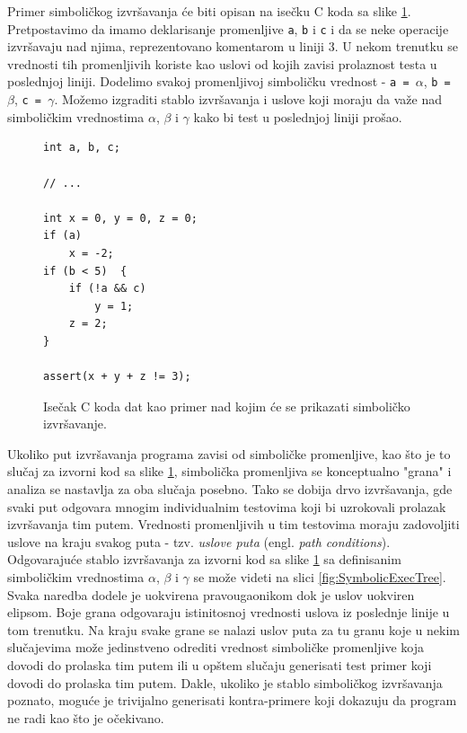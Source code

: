 Primer simboličkog izvršavanja će biti opisan na isečku C koda sa slike \ref{fig:SymbolicExecCode}. Pretpostavimo da imamo deklarisanje promenljive \texttt{a}, \texttt{b} i \texttt{c} i da se neke operacije izvršavaju nad njima, reprezentovano komentarom u liniji $3$. U nekom trenutku se vrednosti tih promenljivih koriste kao uslovi od kojih zavisi prolaznost testa u poslednjoj liniji. Dodelimo svakoj promenljivoj simboličku vrednost - \texttt{a = }$\alpha$, \texttt{b = }$\beta$, \texttt{c = }$\gamma$. Možemo izgraditi stablo izvršavanja i uslove koji moraju da važe nad simboličkim vrednostima $\alpha$, $\beta$ i $\gamma$ kako bi test u poslednjoj liniji prošao.

\begin{figure}[h!]
\begin{lstlisting}[language={}]
int a, b, c;

// ...

int x = 0, y = 0, z = 0;
if (a)      
    x = -2;
if (b < 5)  {
    if (!a && c)    
        y = 1;
    z = 2;
}

assert(x + y + z != 3);
\end{lstlisting}
\caption{Isečak C koda dat kao primer nad kojim će se prikazati simboličko izvršavanje.}
\label{fig:SymbolicExecCode}
\end{figure}

Ukoliko put izvršavanja programa zavisi od simboličke promenljive, kao što je to slučaj za izvorni kod sa slike \ref{fig:SymbolicExecCode}, simbolička promenljiva se konceptualno "grana" i analiza se nastavlja za oba slučaja posebno. Tako se dobija drvo izvršavanja, gde svaki put odgovara mnogim individualnim testovima koji bi uzrokovali prolazak izvršavanja tim putem. Vrednosti promenljivih u tim testovima moraju zadovoljiti uslove na kraju svakog puta - tzv. \emph{uslove puta} (engl. \emph{path conditions}). Odgovarajuće stablo izvršavanja za izvorni kod sa slike \ref{fig:SymbolicExecCode} sa definisanim simboličkim vrednostima $\alpha$, $\beta$ i $\gamma$ se može videti na slici \ref{fig:SymbolicExecTree}. Svaka naredba dodele je uokvirena pravougaonikom dok je uslov uokviren elipsom. Boje grana odgovaraju istinitosnoj vrednosti uslova iz poslednje linije u tom trenutku. Na kraju svake grane se nalazi uslov puta za tu granu koje u nekim slučajevima može jedinstveno odrediti vrednost simboličke promenljive koja dovodi do prolaska tim putem ili u opštem slučaju generisati test primer koji dovodi do prolaska tim putem. Dakle, ukoliko je stablo simboličkog izvršavanja poznato, moguće je trivijalno generisati kontra-primere koji dokazuju da program ne radi kao što je očekivano.


